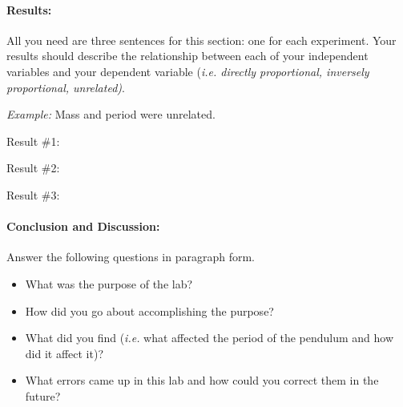 \documentclass[10pt]{exam}
\begin{document}
\pagebreak

\paragraph{Results:} 
  All you need are three sentences for this section: one for each experiment.  Your results should describe the relationship between each of your independent variables and your dependent variable (\emph{i.e. directly proportional, inversely proportional, unrelated)}.
    
  \emph{Example:} Mass and period were unrelated.

  \vspace{3em}

  Result \#1: \vspace{3em} 

  Result \#2: \vspace{3em} 

  Result \#3: \vspace{3em} 


\paragraph{Conclusion and Discussion:}
  Answer the following questions in paragraph form.

  \begin{itemize}
    \item
      What was the purpose of the lab?
    \item
      How did you go about accomplishing the purpose?
    \item
      What did you find (\emph{i.e.} what affected the period of the
      pendulum and how did it affect it)?
    \item
      What errors came up in this lab and how could you correct them in the
      future?
  \end{itemize}
\end{document}
